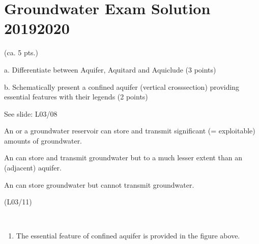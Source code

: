 \documentclass[letterpaper,10pt,english]{jupyterBook}
\begin{document}
\chapter{Groundwater Exam Solution \sphinxhyphen{}  2019\sphinxhyphen{}2020}
\label{\detokenize{content/Q_and_A/GW_exam_2019_20:groundwater-exam-solution-2019-2020}}\label{\detokenize{content/Q_and_A/GW_exam_2019_20::doc}}
\sphinxAtStartPar
{}

\sphinxAtStartPar
{}   (ca. 5 pts.)

\sphinxAtStartPar
a. Differentiate between Aquifer, Aquitard and Aquiclude (3 points)

\sphinxAtStartPar
b. Schematically present a confined aquifer (vertical cross\sphinxhyphen{}section) providing essential features with their legends (2 points)

\sphinxAtStartPar
{}

\sphinxAtStartPar
See slide: L03/08

\sphinxAtStartPar
An  or a groundwater reservoir can store and transmit significant (= exploitable) amounts of groundwater.

\sphinxAtStartPar
An  can store and transmit groundwater but to a much lesser extent than an (adjacent) aquifer.

\sphinxAtStartPar
An  can store groundwater but cannot transmit groundwater.

\sphinxAtStartPar
{} \sphinxhyphen{} (L03/11)

\sphinxAtStartPar
 



\sphinxAtStartPar
{}
\begin{enumerate}
%
\item {} 
\sphinxAtStartPar
The essential feature of confined aquifer is provided in the figure above.

\end{enumerate}
\end{document}
